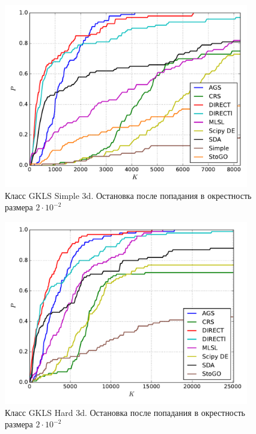 \documentclass[a4paper]{article}
\begin{document}

\begin{figure}[H]
  \center
  \includegraphics[width=0.95\textwidth]{../experiments/gklss3d/cmc.pdf}
  \caption{Класс GKLS Simple 3d. Остановка после попадания в окрестность размера $2\cdot10^{-2}$}
  \label{fig:}
\end{figure}


\begin{figure}[H]
  \center
  \includegraphics[width=0.95\textwidth]{../experiments/gklsh3d/cmc.pdf}
  \caption{Класс GKLS Hard 3d. Остановка после попадания в окрестность размера $2\cdot10^{-2}$}
  \label{fig:}
\end{figure}

\end{document}
